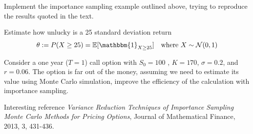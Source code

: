 \documentclass[12pt,a4paper]{article}
\begin{document}
\begin{question}
Implement the importance sampling example outlined above, trying to reproduce the results quoted in the text.
\end{question}
\begin{question}
Estimate how unlucky is a 25 standard deviation return
\begin{equation*}
\theta := P(X\geq 25) = \mathbb{E}[\mathbbm{1}_{X\geq 25}]  \quad\text{where } X\sim \mathcal{N}(0, 1)
\end{equation*}
\end{question}
\begin{question}
Consider a one year ($T=1$) call option with $S_0=100$ , $K=170$,  $\sigma=0.2$, and $r=0.06$. The option is far out of the money, assuming we need to estimate its value using Monte Carlo simulation, improve the efficiency of the calculation with importance sampling.

\noindent
Interesting reference \emph{Variance Reduction Techniques of Importance Sampling Monte Carlo Methods for Pricing Options}, 
Journal of Mathematical Finance, 2013, 3, 431-436.
\end{question}

\clearpage
\tableofcontents
\end{document}
